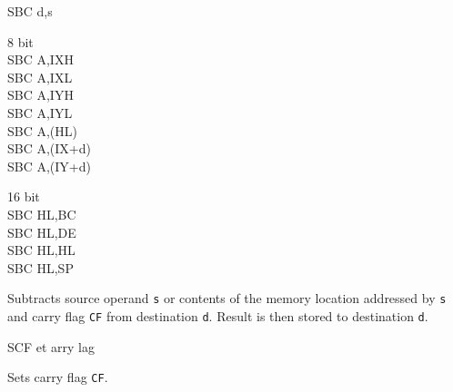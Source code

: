 \begin{basedescript}{
    \desclabelstyle{\multilinelabel}
    \desclabelwidth{3cm}}
\begin{DetailItem}{SBC d,s}
\begin{DetailVariants}
            \columnbreak
            \textnormal{8 bit}\\
            SBC A,IXH\UNDOC\\
            SBC A,IXL\UNDOC\\
            SBC A,IYH\UNDOC\\
            SBC A,IYL\UNDOC\\
            SBC A,(HL)\\
            SBC A,(IX+d)\\
            SBC A,(IY+d)

            \columnbreak
            \textnormal{16 bit}\\
            SBC HL,BC\\
            SBC HL,DE\\
            SBC HL,HL\\
            SBC HL,SP
        \end{DetailVariants}
		
        Subtracts source operand {\tt s} or contents of the memory location addressed by {\tt s} and carry flag {\tt CF} from destination {\tt d}. Result is then stored to destination {\tt d}.

        \begin{DetailEffects}[v]
            \FlagsSBCr[8-bit]
            \FlagsSBCrr[16-bit]
        \end{DetailEffects}
						
        \begin{DetailTiming}
        \end{DetailTiming}

    \end{DetailItem}

    \begin{DetailItem}{SCF}
        {et arry lag}
        {\SymSCF}

        Sets carry flag {\tt CF}.

        \begin{DetailEffects}
            \FlagsSCF
        \end{DetailEffects}
						

\end{DetailItem}
\end{basedescript}
